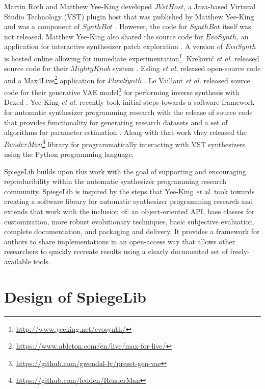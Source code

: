  Martin Roth and Matthew Yee-King developed $JVstHost$, a Java-based Virtural Studio Technology (VST) plugin host that was published by Matthew Yee-King \cite{yee2011automatic} and was a component of $SynthBot$ \cite{yee2008synthbot}. However, the code for $SynthBot$ itself was not released. Matthew Yee-King also shared the source code for $EvoSynth$, an application for interactive synthesizer patch exploration \cite{yee2016use}. A version of $EvoSynth$ is hosted online allowing for immediate experimentation\footnote{\url{http://www.yeeking.net/evosynth/}}. Krekovi{\'c} \textit{et al.} released source code for their $MightyKnob$ system \cite{krekovic2016algorithm}. Esling \textit{et al.} released open-source code and a Max4Live\footnote{\url{https://www.ableton.com/en/live/max-for-live/}} application for $FlowSynth$ \cite{esling2020flow}. Le Vaillant \textit{et al.} released source code for their generative VAE model\footnote{\url{https://github.com/gwendal-lv/preset-gen-vae}} for performing inverse synthesis with Dexed \cite{le2021improving}. Yee-King \textit{et al.} recently took initial steps towards a software framework for automatic synthesizer programming research with the release of source code that provides functionality for generating research datasets and a set of algorithms for parameter estimation \cite{yee2018automatic}. Along with that work they released the $RenderMan$\footnote{\url{https://github.com/fedden/RenderMan}} library for programmatically interacting with VST synthesizers using the Python programming language.
 
 SpiegeLib builds upon this work with the goal of supporting and encouraging reproducibility within the automatic synthesizer programming research community. SpiegeLib is inspired by the steps that Yee-King \textit{et al.} took towards creating a software library for automatic synthesizer programming research and extends that work with the inclusion of: an object-oriented API, base classes for customization, more robust evolutionary techniques, basic subjective evaluation, complete documentation, and packaging and delivery. It provides a framework for authors to share implementations in an open-access way that allows other researchers to quickly recreate results using a clearly documented set of freely-available tools.
 
\section{Design of SpiegeLib}
\label{chapter:inverse_synth;section:spiegelib}

